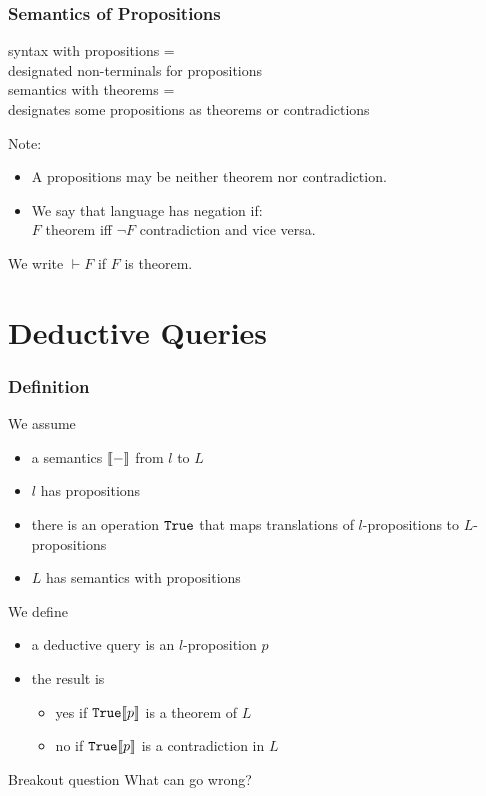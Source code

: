 \documentclass{beamer}
\begin{document}
\begin{frame}\frametitle{Semantics of Propositions}
syntax with propositions = \\
designated non-terminals for propositions \\
semantics with theorems = \\
designates some propositions as theorems or contradictions

Note:
\begin{itemize}
\item A propositions may be neither theorem nor contradiction.
\item We say that language has negation if:\\ $F$ theorem iff $\neg F$ contradiction and vice versa.
\end{itemize}

We write $\vdash F$ if $F$ is theorem.
\end{frame}

\section{Deductive Queries}

\begin{frame}\frametitle{Definition}
We assume
\begin{itemize}
\item a semantics $\llbracket -\rrbracket$ from $l$ to $L$
\item $l$ has propositions
\item there is an operation $\mathtt{True}$ that maps translations of $l$-propositions to $L$-propositions
\item $L$ has semantics with propositions
\end{itemize}

We define
\begin{itemize}
\item a deductive query is an $l$-proposition $p$
\item the result is
 \begin{itemize}
 \item yes if $\mathtt{True} \llbracket p\rrbracket$ is a theorem of $L$
 \item no if $\mathtt{True} \llbracket p\rrbracket$ is a contradiction in $L$
 \end{itemize}
\end{itemize}
\end{frame}

\begin{frame}{Breakout question}
What can go wrong?
\end{frame}
\end{document}
